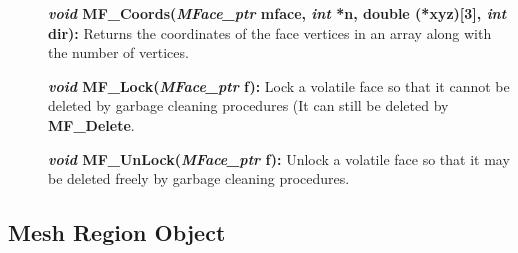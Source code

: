 \documentclass[12pt]{article}
\begin{document}
\begin{description}
\item[]

\item[]{\bf {\em void} MF\_Coords({\em MFace\_ptr} mface,
{\em int} *n, double (*xyz)[3], {\em int} dir):} Returns the
coordinates of the face vertices in an array along with the number of
vertices. 

\item[]

\item[]{\bf {\em void} MF\_Lock({\em MFace\_ptr} f):} Lock a volatile
  face so that it cannot be deleted by garbage cleaning procedures (It
  can still be deleted by {\bf MF\_Delete}.

\item[]{\bf {\em void} MF\_UnLock({\em MFace\_ptr} f):} Unlock a volatile
  face so that it may be deleted freely by garbage cleaning procedures.


\end{description}

\newpage
\subsection{Mesh Region Object}
\end{document}
